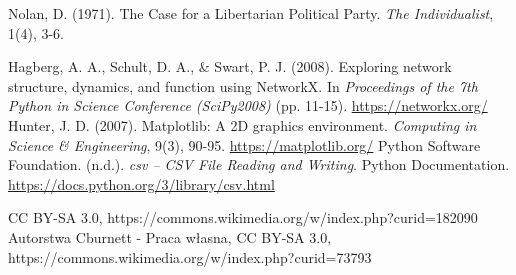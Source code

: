  Nolan, D. (1971). The Case for a Libertarian Political Party. \textit{The Individualist}, 1(4), 3-6.

 Hagberg, A. A., Schult, D. A., \& Swart, P. J. (2008). Exploring network structure, dynamics, and function using NetworkX. In \textit{Proceedings of the 7th Python in Science Conference (SciPy2008)} (pp. 11-15). \url{https://networkx.org/}
 Hunter, J. D. (2007). Matplotlib: A 2D graphics environment. \textit{Computing in Science \& Engineering}, 9(3), 90-95. \url{https://matplotlib.org/}
 Python Software Foundation. (n.d.). \textit{csv – CSV File Reading and Writing}. Python Documentation. \url{https://docs.python.org/3/library/csv.html}

 CC BY-SA 3.0, https://commons.wikimedia.org/w/index.php?curid=182090
 Autorstwa Cburnett - Praca własna, CC BY-SA 3.0, https://commons.wikimedia.org/w/index.php?curid=73793